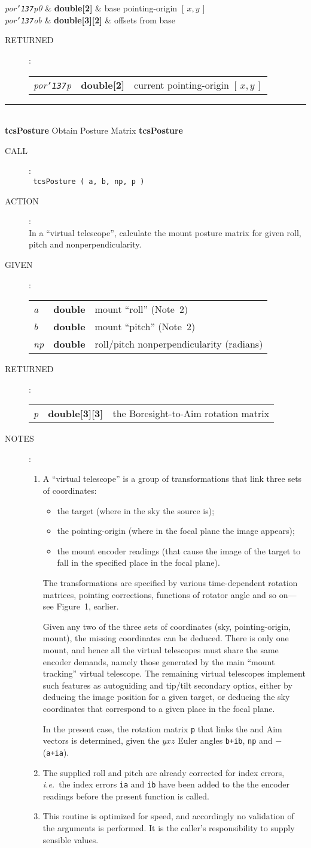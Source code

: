 \documentclass[12pt,fleqn,twoside]{article}
\renewcommand{\_}{{\tt\char'137}}     %
\newcommand{\xy}        {$[\,x,y\,]$}
\newcommand{\routine}[2]
{
  \newpage
  \rule{\textwidth}{0.3mm}\\ \nopagebreak
  {\Large {\bf #1} \hfill #2 \hfill {\bf #1}}
  \vspace{-1ex}
}
\newcommand{\call}[1]
{
  \goodbreak
  \begin{description}
    \item[CALL]: \\[0.5ex] \nopagebreak
        {\tt #1}
  \end{description}
  \vspace{-3ex}
}
\newcommand{\action}[1]
{
  \goodbreak
  \begin{description}
    \item[ACTION]: \\[0.5ex] \nopagebreak
        #1
  \end{description}
  \vspace{-3ex}
}
\newcommand{\args}[2]
{
  \goodbreak
  \begin{description}
  \item[#1]: \\[1.5ex] \nopagebreak
    \hspace*{-0.9em}
    \begin{tabular}{p{4.5em}p{5.8em}p{23.5em}}
      #2
    \end{tabular}
  \end{description}
  \vspace{-3ex}
}
\newcommand{\spec}[3]
{
  {\em {#1}} & {\bf \mbox{#2}} & {#3}
}
\newcommand{\notes}[1]
{
  \goodbreak
  \begin{description}
    \item[NOTES]: \nopagebreak
        #1
  \end{description}
  \vspace{-3ex}
}
\begin{document}
{
\spec{por\_p0}{double[2]}{base pointing-origin \xy} \\
\spec{por\_ob}{double[3][2]}{offsets from base}
}
\args{RETURNED}
{
\spec{por\_p}{double[2]}{current pointing-origin \xy}
}
\routine{tcsPosture}{Obtain Posture Matrix}
\label{tcsPosture}
\call{ tcsPosture ( a, b, np, p ) }
\action{In a ``virtual telescope'', calculate the mount posture matrix for
        given roll, pitch and nonperpendicularity.}
\args{GIVEN}
{
\spec{a }{double}{mount ``roll'' (Note~2)} \\
\spec{b }{double}{mount ``pitch'' (Note~2)} \\
\spec{np}{double}{roll/pitch nonperpendicularity (radians)}
}
\args{RETURNED}
{
\spec{p}{double[3][3]}{the {\sc Boresight}-to-{\sc Aim} rotation matrix}
}
\notes{
\begin{enumerate}
\setlength{\parskip}{\medskipamount}
\item A ``virtual telescope'' is a group of transformations that link
      three sets of coordinates:
      \begin{itemize}
      \item the target (where in the sky the source is);
      \item the pointing-origin (where in the focal plane the image
            appears);
      \item the mount encoder readings (that cause the image of the
            target to fall in the specified place in the focal plane).
      \end{itemize}
      The transformations are specified by various time-dependent
      rotation matrices, pointing corrections, functions of rotator
      angle and so on---see Figure~1, earlier.

      Given any two of the three sets of coordinates
      (sky, pointing-origin, mount), the missing coordinates
      can be deduced.  There is
      only one mount, and hence all the virtual telescopes must share
      the same encoder demands, namely those generated by the main
      ``mount tracking'' virtual telescope.  The remaining virtual
      telescopes implement such features as autoguiding and tip/tilt
      secondary optics, either by deducing the image position for a
      given target, or deducing the sky coordinates that correspond to
      a given place in the focal plane.

      In the present case, the rotation matrix
      {\tt p} that links the {\sc {\sc Boresight}} and
      {\sc Aim} vectors is determined, given the $yxz$ Euler angles
      {\tt b+ib}, {\tt np} and $-$({\tt a+ia}).
\item The supplied roll and pitch are already corrected for index
      errors, {\it i.e.}~the index errors {\tt ia}
      and {\tt ib} have been added to the
      the encoder readings before the present function is called.
\item This routine is optimized for speed, and accordingly no validation
      of the arguments is performed.  It is the caller's responsibility
      to supply sensible values.
\end{enumerate}
}
\end{document}
